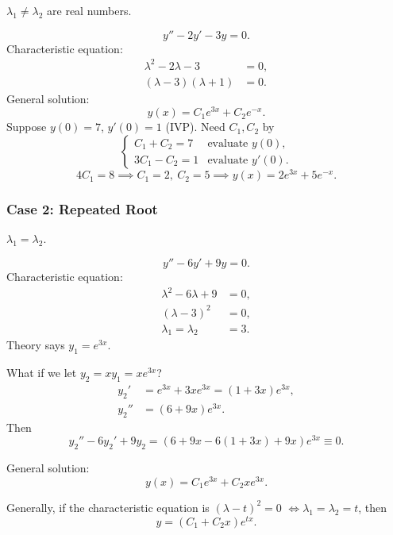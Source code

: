 $\lambda_1\ne\lambda_2$ are real numbers.

\begin{example}
  \[
    y''-2y'-3y=0.
  \]
  Characteristic equation:
  \begin{align*}
    \lambda^2-2\lambda-3   & =0, \\
    (\lambda-3)(\lambda+1) & =0.
  \end{align*}
  General solution:
  \[
    y(x)=C_1e^{3x}+C_2e^{-x}.
  \]
  Suppose $y(0)=7$, $y'(0)=1$ (IVP). Need $C_1,C_2$ by
  \[
    \begin{cases}
      C_1+C_2=7  & \text{evaluate }y(0),  \\
      3C_1-C_2=1 & \text{evaluate }y'(0).
    \end{cases}
  \]
  \[
    4C_1=8\implies C_1=2,\ C_2=5
    \implies y(x)=2e^{3x}+5e^{-x}.
  \]
\end{example}

\subsubsection{Case 2: Repeated Root}

$\lambda_1=\lambda_2$.

\begin{example}
  \[
    y''-6y'+9y=0.
  \]
  Characteristic equation:
  \begin{align*}
    \lambda^2-6\lambda+9 & =0, \\
    (\lambda-3)^2        & =0, \\
    \lambda_1=\lambda_2  & =3.
  \end{align*}
  Theory says $y_1=e^{3x}$.

  \begin{thinking}
    What if we let $y_2=xy_1=xe^{3x}$?
    \begin{align*}
      y_2'  & =e^{3x}+3xe^{3x}=(1+3x)e^{3x}, \\
      y_2'' & =(6+9x)e^{3x}.
    \end{align*}
    Then
    \[
      y_2''-6y_2'+9y_2
      =(6+9x-6(1+3x)+9x)e^{3x}\equiv0.
    \]
  \end{thinking}

  General solution:
  \[
    y(x)=C_1e^{3x}+C_2xe^{3x}.
  \]
\end{example}

Generally, if the characteristic equation is $(\lambda-t)^2=0$
$\Longleftrightarrow\lambda_1=\lambda_2=t$, then
\[
  y=(C_1+C_2x)e^{tx}.
\]

